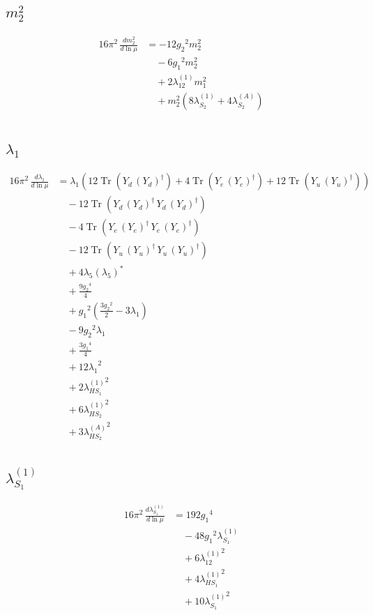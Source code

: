 \documentclass[10pt,a4paper]{article}
\begin{document}
\subsection*{$m_2^2$}
\begin{align*}
16\pi^2\,\frac{d m_2^2}{d\ln\mu} &=-12 {g_2}^2 {m_2^2} \\
&\quad -6 {g_1}^2 {m_2^2} \\
&\quad +2 {\lambda_{12}^{(1)}} {m_1^2} \\
&\quad +{m_2^2} (8 {\lambda_{S_2}^{(1)}}+4 {\lambda_{S_2}^{(A)}}) \\
\end{align*}
\subsection*{$\lambda_1$}
\begin{align*}
16\pi^2\,\frac{d \lambda_1}{d\ln\mu} &={\lambda_1} (12 \operatorname{Tr}\!\left({Y_d}\,\left({Y_d}\right)^{\dagger}\right)+4 \operatorname{Tr}\!\left({Y_e}\,\left({Y_e}\right)^{\dagger}\right)+12 \operatorname{Tr}\!\left({Y_u}\,\left({Y_u}\right)^{\dagger}\right)) \\
&\quad -12 \operatorname{Tr}\!\left({Y_d}\,\left({Y_d}\right)^{\dagger}\,{Y_d}\,\left({Y_d}\right)^{\dagger}\right) \\
&\quad -4 \operatorname{Tr}\!\left({Y_e}\,\left({Y_e}\right)^{\dagger}\,{Y_e}\,\left({Y_e}\right)^{\dagger}\right) \\
&\quad -12 \operatorname{Tr}\!\left({Y_u}\,\left({Y_u}\right)^{\dagger}\,{Y_u}\,\left({Y_u}\right)^{\dagger}\right) \\
&\quad +4 {\lambda_5} \left({\lambda_5}\right)^{*} \\
&\quad +\frac{9 {g_2}^4}{4} \\
&\quad +{g_1}^2 \left(\frac{3 {g_2}^2}{2}-3 {\lambda_1}\right) \\
&\quad -9 {g_2}^2 {\lambda_1} \\
&\quad +\frac{3 {g_1}^4}{4} \\
&\quad +12 {\lambda_1}^2 \\
&\quad +2 {\lambda_{HS_1}^{(1)}}^2 \\
&\quad +6 {\lambda_{HS_2}^{(1)}}^2 \\
&\quad +3 {\lambda_{HS_2}^{(A)}}^2 \\
\end{align*}
\subsection*{$\lambda_{S_1}^{(1)}$}
\begin{align*}
16\pi^2\,\frac{d \lambda_{S_1}^{(1)}}{d\ln\mu} &=192 {g_1}^4 \\
&\quad -48 {g_1}^2 {\lambda_{S_1}^{(1)}} \\
&\quad +6 {\lambda_{12}^{(1)}}^2 \\
&\quad +4 {\lambda_{HS_1}^{(1)}}^2 \\
&\quad +10 {\lambda_{S_1}^{(1)}}^2 \\
\end{align*}
\end{document}
